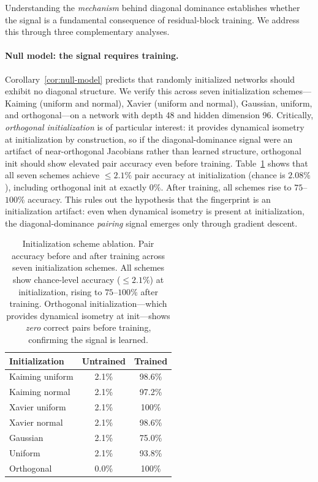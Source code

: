 \documentclass[wcp]{jmlr}
\begin{document}
Understanding the \emph{mechanism} behind diagonal dominance establishes whether the signal is a fundamental consequence of residual-block training. We address this through three complementary analyses.

\paragraph{Null model: the signal requires training.}
Corollary~\ref{cor:null-model} predicts that randomly initialized networks should exhibit no diagonal structure. We verify this across seven initialization schemes---Kaiming (uniform and normal), Xavier (uniform and normal), Gaussian, uniform, and orthogonal---on a network with depth 48 and hidden dimension 96. Critically, \emph{orthogonal initialization} is of particular interest: it provides dynamical isometry at initialization by construction, so if the diagonal-dominance signal were an artifact of near-orthogonal Jacobians rather than learned structure, orthogonal init should show elevated pair accuracy even before training. Table~\ref{tab:init_ablation} shows that all seven schemes achieve ${\leq}2.1\%$ pair accuracy at initialization (chance is $2.08\%$), including orthogonal init at exactly $0\%$. After training, all schemes rise to $75$--$100\%$ accuracy. This rules out the hypothesis that the fingerprint is an initialization artifact: even when dynamical isometry is present at initialization, the diagonal-dominance \emph{pairing} signal emerges only through gradient descent.

\begin{table}[h]
\centering
\small
\begin{tabular}{lcc}
\toprule
Initialization & Untrained & Trained \\
\midrule
Kaiming uniform & 2.1\% & 98.6\% \\
Kaiming normal & 2.1\% & 97.2\% \\
Xavier uniform & 2.1\% & 100\% \\
Xavier normal & 2.1\% & 98.6\% \\
Gaussian & 2.1\% & 75.0\% \\
Uniform & 2.1\% & 93.8\% \\
Orthogonal & 0.0\% & 100\% \\
\bottomrule
\end{tabular}
\caption{Initialization scheme ablation. Pair accuracy before and after training across seven initialization schemes. All schemes show chance-level accuracy (${\leq}2.1\%$) at initialization, rising to $75$--$100\%$ after training. Orthogonal initialization---which provides dynamical isometry at init---shows \emph{zero} correct pairs before training, confirming the signal is learned.}
\label{tab:init_ablation}
\end{table}
\end{document}

